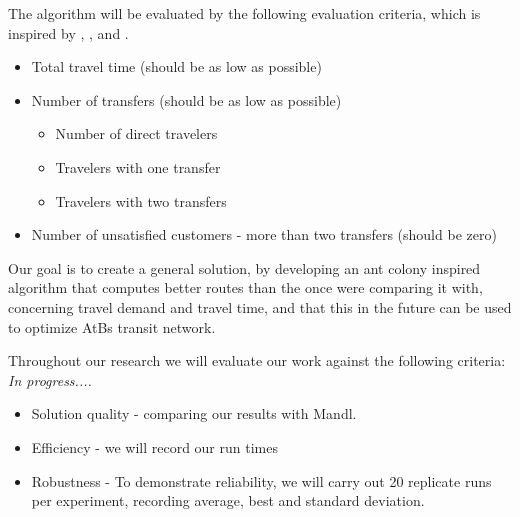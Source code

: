 The algorithm will be evaluated by the following evaluation criteria, which is inspired by \citep{kechagiopoulos14}, \citep{mandl80}, \citep{nikolic14} and \citep{fan09}.
\begin{itemize}
\item Total travel time (should be as low as possible)
\item Number of transfers (should be as low as possible)
\begin{itemize}
\item Number of direct travelers 
\item Travelers with one transfer
\item Travelers with two transfers
\end{itemize}
\item Number of unsatisfied customers - more than two transfers (should be zero)
\end{itemize}

Our goal is to create a general solution, by developing an ant colony inspired algorithm that computes better routes than the once were comparing it with, concerning travel demand and travel time, and that this in the future can be used to optimize AtBs transit network. %

Throughout our research we will evaluate our work against the following criteria: \textit{In progress....}
\begin{itemize}
\item Solution quality - comparing our results with Mandl.
\item Efficiency - we will record our run times
\item Robustness - To demonstrate reliability, we will carry out 20 replicate runs per experiment, recording average, best and standard deviation. 
\end{itemize}




